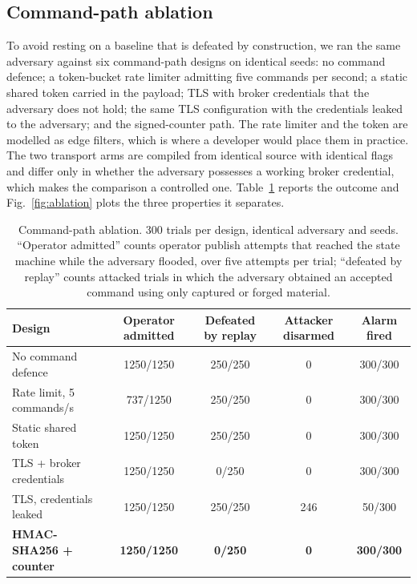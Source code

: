 \subsection{Command-path ablation}

To avoid resting on a baseline that is defeated by construction, we ran the same adversary
against six command-path designs on identical seeds: no command defence; a token-bucket rate limiter
admitting five commands per second; a static shared token carried in the payload; TLS with
broker credentials that the adversary does not hold; the same TLS configuration with the
credentials leaked to the adversary; and the signed-counter path. The rate limiter and the token
are modelled as edge filters, which is where a developer would place them in practice. The two
transport arms are compiled from identical source with identical flags and differ only in
whether the adversary possesses a working broker credential, which makes the comparison a
controlled one. Table~\ref{tab:ablation} reports the outcome and Fig.~\ref{fig:ablation} plots
the three properties it separates.

\begin{table}[t]
\centering\small
\caption{Command-path ablation. 300 trials per design, identical adversary and seeds.
``Operator admitted'' counts operator publish attempts that reached the state machine while the
adversary flooded, over five attempts per trial; ``defeated by replay'' counts attacked trials in
which the adversary obtained an accepted command using only captured or forged material.}
\label{tab:ablation}
\begin{tabular}{@{}lcccc@{}}
\toprule
Design & Operator admitted & Defeated by replay & Attacker disarmed & Alarm fired \\
\midrule
No command defence             & 1250/1250        & 250/250        & 0            & 300/300 \\
Rate limit, 5 commands/s       & 737/1250         & 250/250        & 0            & 300/300 \\
Static shared token            & 1250/1250        & 250/250        & 0            & 300/300 \\
TLS + broker credentials       & 1250/1250        & 0/250          & 0            & 300/300 \\
TLS, credentials leaked        & 1250/1250        & 250/250        & 246          & 50/300  \\
\textbf{HMAC-SHA256 + counter} & \textbf{1250/1250} & \textbf{0/250} & \textbf{0} & \textbf{300/300} \\
\bottomrule
\end{tabular}
\end{table}

